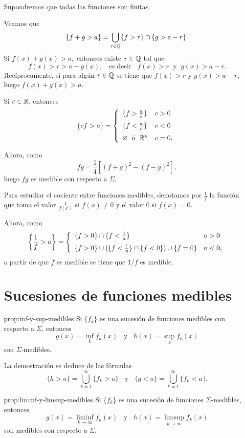 \begin{demo}
Supondremos que todas las funciones son finitas.

Veamos que 
\[
\{
f+g>a\}=\bigcup\limits_{r \in \mathbb{Q}} \{ f>r\} \cap \{g>a-r\}.
\]
Si $f(x)+g(x)>a,$ entonces existe $r \in \mathbb{Q}$ tal que 
\[
f(x)>r>a-g(x),\;\;\mbox{ es decir }\;\; 
f(x)>r\;\mbox{ y }\; g(x)>a-r.
\]
Rec\'iprocamente, si para alg\'un $r\in \mathbb{Q}$ se tiene que $f(x)>r$ y $g(x)>a-r$, luego $f(x)+g(x)>a$.

Si $c\in \mathbb{R}$, entonces
\[
\{cf>a\}=
\left\{
\begin{array}{ll}
\{f>\frac{a}{c}\}&c>0
\medskip
\\
\{f<\frac{a}{c}\}&c<0
\medskip
\\
\emptyset\;\mbox{ \'o }\;\rr^n &c=0.
\end{array}
\right.
\]

Ahora, como 
\[
fg=\frac{1}{4}\left[(f+g)^2-(f-g)^2\right],
\]
luego $fg$ es medible con respecto a $\Sigma$. 

Para estudiar el cociente entre funciones medibles, denotamos por $\frac{1}{f}$
la funci\'on que toma el valor $\frac{1}{f(x)}$ si $f(x)\neq 0$ y el valor $0$ si $f(x)=0$.

Ahora, como 
\[
\left\{\frac{1}{f}>a\right\}
=
\left \{
\begin{array}{ll}
 \{f>0\} \cap \{f<\frac{1}{a}\}    &  a>0 
 \medskip
 \\
 \{ f>0\} \cup  (\{f<\frac{1}{a}\} \cap \{f<0\}) \cup \{f=0\}
     & a<0, 
\end{array}
\right.
\]
a partir de que $f$ es medible se tiene que  $1/f$ es medible. 
\end{demo}

\section{Sucesiones de funciones medibles}

\begin{proposicion}{prop:inf-y-sup-medibles}
Si $\{f_k\}$ es una sucesi\'on de funciones medibles con respecto a $\Sigma$, 
entonces
\[
g(x)=\inf\limits_{k} f_k(x) \;\;\mbox{ y }\;\; h(x)=\sup\limits_{k} f_k(x) 
\]
son $\Sigma$-medibles. 
\end{proposicion}


La demostraci\'on se deduce de las f\'ormulas
\[
\{h>a \}=\bigcup_{k=1}^{\infty} \{f_k>a\}
\;\;\mbox{ y }\;\;
\{g<a \}=\bigcup_{k=1}^{\infty} \{f_k<a\}.
\]

\begin{proposicion}{prop:liminf-y-limsup-medibles}
Si $\{f_k\}$ es una sucesi\'on de funciones $\Sigma$-medibles, entonces
\[
g(x)=\liminf\limits_{k \to \infty} f_k(x)
\;\;\mbox{ y }
\;\;
h(x)=\limsup\limits_{k \to \infty} f_k(x)
\]
son   medibles con respecto a $\Sigma$.
\end{proposicion}


